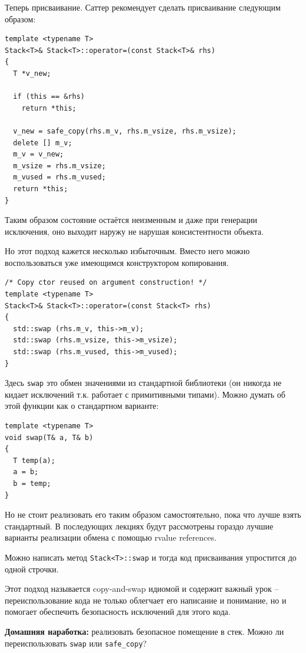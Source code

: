 \documentclass[a4paper,12pt,oneside]{article}
\begin{document}
Теперь присваивание. Саттер рекомендует сделать присваивание следующим образом:

\begin{lstlisting}
template <typename T>
Stack<T>& Stack<T>::operator=(const Stack<T>& rhs)
{
  T *v_new;

  if (this == &rhs)
    return *this;

  v_new = safe_copy(rhs.m_v, rhs.m_vsize, rhs.m_vsize);
  delete [] m_v;
  m_v = v_new;
  m_vsize = rhs.m_vsize; 
  m_vused = rhs.m_vused;
  return *this;
}
\end{lstlisting}

Таким образом состояние остаётся неизменным и даже при генерации исключения, оно выходит наружу не нарушая консистентности объекта.

Но этот подход кажется несколько избыточным. Вместо него можно воспользоваться уже имеющимся конструктором копирования.

\begin{lstlisting}
/* Copy ctor reused on argument construction! */
template <typename T>
Stack<T>& Stack<T>::operator=(const Stack<T> rhs)
{
  std::swap (rhs.m_v, this->m_v);
  std::swap (rhs.m_vsize, this->m_vsize);
  std::swap (rhs.m_vused, this->m_vused);
}
\end{lstlisting}

Здесь \lstinline!swap! это обмен значениями из стандартной библиотеки (он никогда не кидает исключений т.к. работает с примитивными типами). Можно думать об этой функции как о стандартном варианте:

\begin{lstlisting}
template <typename T>
void swap(T& a, T& b)
{
  T temp(a);
  a = b;
  b = temp;
}
\end{lstlisting}

Но не стоит реализовать его таким образом самостоятельно, пока что лучше взять стандартный. В последующих лекциях будут рассмотрены гораздо лучшие варианты реализации обмена с помощью rvalue references.

Можно написать метод \lstinline!Stack<T>::swap! и тогда код присваивания упростится до одной строчки.

Этот подход называется copy-and-swap идиомой и содержит важный урок -- переиспользование кода не только облегчает его написание и понимание, но и помогает обеспечить безопасность исключений для этого кода.

\textbf{Домашняя наработка:} реализовать безопасное помещение в стек. Можно ли переиспользовать \lstinline!swap! или \lstinline!safe_copy!?
\end{document}
